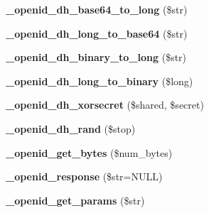 \begin{DoxyCompactItemize}
\item 
\hypertarget{openid_8inc_add8eead4c4954c3ad50ff4990f165478}{
{\bfseries \_\-openid\_\-dh\_\-base64\_\-to\_\-long} (\$str)}
\label{openid_8inc_add8eead4c4954c3ad50ff4990f165478}

\item 
\hypertarget{openid_8inc_a796f1e583d3276d8e8032fa5a4c0f616}{
{\bfseries \_\-openid\_\-dh\_\-long\_\-to\_\-base64} (\$str)}
\label{openid_8inc_a796f1e583d3276d8e8032fa5a4c0f616}

\item 
\hypertarget{openid_8inc_a422c58798b7986b43a2b565df1b9f2d7}{
{\bfseries \_\-openid\_\-dh\_\-binary\_\-to\_\-long} (\$str)}
\label{openid_8inc_a422c58798b7986b43a2b565df1b9f2d7}

\item 
\hypertarget{openid_8inc_a9d1a28ec06188bbbc85acf1bfc41ae1d}{
{\bfseries \_\-openid\_\-dh\_\-long\_\-to\_\-binary} (\$long)}
\label{openid_8inc_a9d1a28ec06188bbbc85acf1bfc41ae1d}

\item 
\hypertarget{openid_8inc_af0f8bf2c50cbe825681e7e319a1fd33f}{
{\bfseries \_\-openid\_\-dh\_\-xorsecret} (\$shared, \$secret)}
\label{openid_8inc_af0f8bf2c50cbe825681e7e319a1fd33f}

\item 
\hypertarget{openid_8inc_a58900a927921ff4c61f925b81ceabbc0}{
{\bfseries \_\-openid\_\-dh\_\-rand} (\$stop)}
\label{openid_8inc_a58900a927921ff4c61f925b81ceabbc0}

\item 
\hypertarget{openid_8inc_ad13ffee2af6f25a64082b7e2c3cfe39f}{
{\bfseries \_\-openid\_\-get\_\-bytes} (\$num\_\-bytes)}
\label{openid_8inc_ad13ffee2af6f25a64082b7e2c3cfe39f}

\item 
\hypertarget{openid_8inc_a56f4846ea99195ce405d7b9704b424b0}{
{\bfseries \_\-openid\_\-response} (\$str=NULL)}
\label{openid_8inc_a56f4846ea99195ce405d7b9704b424b0}

\item 
\hypertarget{openid_8inc_ae62ec8d61534cb5aa5a4a8f0d01b5dee}{
{\bfseries \_\-openid\_\-get\_\-params} (\$str)}
\label{openid_8inc_ae62ec8d61534cb5aa5a4a8f0d01b5dee}


\end{DoxyCompactItemize}
